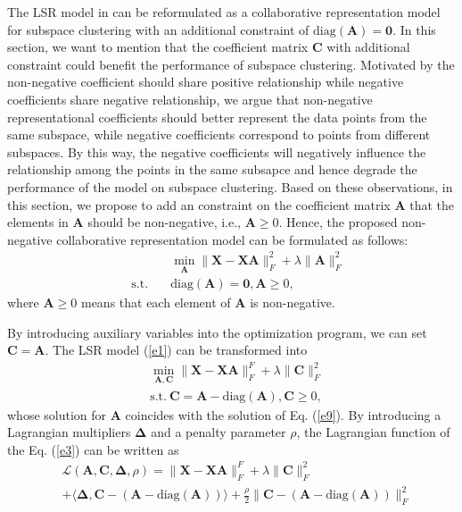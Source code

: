 \documentclass[10pt,twocolumn,letterpaper]{article}
\begin{document}
The LSR model in \cite{lsr} can be reformulated as a collaborative representation model \cite{crc} for subspace clustering with an additional constraint of $\text{diag}(\bm{A})=\bm{0}$. In this section, we want to mention that the coefficient matrix $\bm{C}$ with additional constraint could benefit the performance of subspace clustering. Motivated by the non-negative coefficient should share positive relationship while negative coefficients share negative relationship, we argue that non-negative representational coefficients should better represent the data points from the same subspace, while negative coefficients correspond to points from different subspaces. By this way, the negative coefficients will negatively influence the relationship among the points in the same subsapce and hence degrade the performance of the model on subspace clustering. Based on these observations, in this section, we propose to add an constraint on the coefficient matrix $\bm{A}$ that the elements in $\bm{A}$ should be non-negative, i.e., $\bm{A}\ge0$. Hence, the proposed non-negative collaborative representation model can be formulated as follows: 
\begin{equation}
\begin{split}
\label{e11}
&
\min_{\bm{A}}
\|
\bm{X}
-
\bm{X}\bm{A}
\|_{F}^{2}
+
\lambda
\|
\bm{A}
\|_{F}^{2}
\\
\quad 
\text{s.t.}
\quad
&
\text{diag}(\bm{A})=\bm{0}
,
\bm{A}\ge0
,
\end{split}
\end{equation}
where $\bm{A}\ge0$ means that each element of $\bm{A}$ is non-negative.

By introducing auxiliary variables into the optimization program, we can set 
$
\bm{C}
=
\bm{A}
$.
The LSR model (\ref{e1}) can be transformed into
\begin{equation}
\begin{split}
\label{e12}
&
\min_{\bm{A},\bm{C}}
\|
\bm{X}
-
\bm{X}\bm{A}
\|_{F}^{F}
+
\lambda
\|
\bm{C}
\|_{F}^{2}
\\
& 
\text{s.t.}
\ 
\bm{C}=\bm{A}-\text{diag}(\bm{A})
,
\bm{C}\ge0
,
\end{split}
\end{equation}
whose solution for $\bm{A}$ coincides with the solution of Eq. (\ref{e9}). By introducing a Lagrangian multipliers $\bm{\Delta}$ and a penalty parameter $\rho$, the Lagrangian function of the Eq. (\ref{e3}) can be written as
\begin{equation}
\begin{split}
\label{e13}
&
\mathcal{L}
(\bm{A},\bm{C},\bm{\Delta},\rho)
=
\|
\bm{X}
-
\bm{X}\bm{A}
\|_{F}^{F}
+
\lambda
\|
\bm{C}
\|_{F}^{2}
\\
&
+
\langle
\bm{\Delta},
\bm{C}-(\bm{A}-\text{diag}(\bm{A}))
\rangle
+
\frac{\rho}{2}
\|
\bm{C}-(\bm{A}-\text{diag}(\bm{A}))
\|_{F}^{2}
\end{split}
\end{equation}
\end{document}
